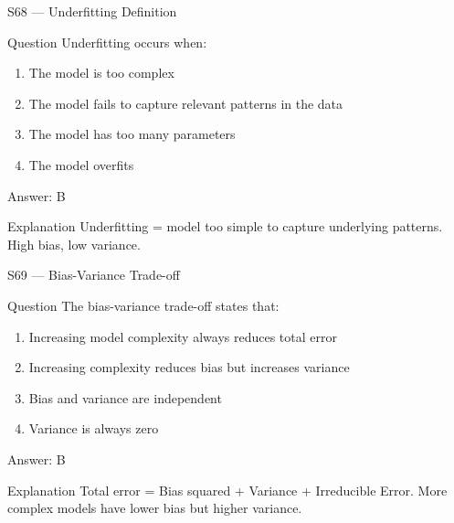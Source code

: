 \documentclass[aspectratio=169,8pt]{beamer}
\begin{document}
	\begin{frame}{S68 --- Underfitting Definition}
		\begin{block}{Question}
			Underfitting occurs when:
			\begin{enumerate}
				\item The model is too complex
				\item The model fails to capture relevant patterns in the data
				\item The model has too many parameters
				\item The model overfits
			\end{enumerate}
		\end{block}
		\begin{exampleblock}{Answer: B}\end{exampleblock}
		\begin{block}{Explanation}
			Underfitting = model too simple to capture underlying patterns. High bias, low variance.
		\end{block}
	\end{frame}
	
	\begin{frame}{S69 --- Bias-Variance Trade-off}
		\begin{block}{Question}
			The bias-variance trade-off states that:
			\begin{enumerate}
				\item Increasing model complexity always reduces total error
				\item Increasing complexity reduces bias but increases variance
				\item Bias and variance are independent
				\item Variance is always zero
			\end{enumerate}
		\end{block}
		\begin{exampleblock}{Answer: B}\end{exampleblock}
		\begin{block}{Explanation}
			Total error = Bias squared + Variance + Irreducible Error. More complex models have lower bias but higher variance.
		\end{block}
	\end{frame}
	
\end{document}
